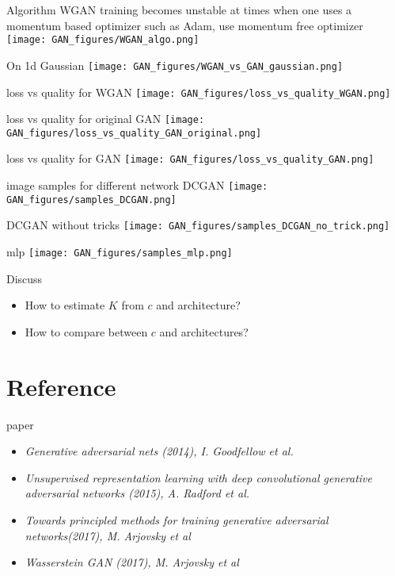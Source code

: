 \documentclass[9pt]{beamer}
\begin{document}
\begin{frame}{Algorithm}
WGAN training becomes unstable at times when one uses a momentum based
optimizer such as Adam, use momentum free optimizer
\texttt{[image: GAN\_figures/WGAN\_algo.png]}
\end{frame}

\begin{frame}{On 1d Gaussian}
  \texttt{[image: GAN\_figures/WGAN\_vs\_GAN\_gaussian.png]}
\end{frame}

\begin{frame}{loss vs quality for WGAN}
  \texttt{[image: GAN\_figures/loss\_vs\_quality\_WGAN.png]}
\end{frame}

\begin{frame}{loss vs quality for original GAN}
  \texttt{[image: GAN\_figures/loss\_vs\_quality\_GAN\_original.png]}
\end{frame}

\begin{frame}{loss vs quality for GAN}
  \texttt{[image: GAN\_figures/loss\_vs\_quality\_GAN.png]}
\end{frame}

\begin{frame}{image samples for different network}
  DCGAN
  \texttt{[image: GAN\_figures/samples\_DCGAN.png]}

  DCGAN without tricks
  \texttt{[image: GAN\_figures/samples\_DCGAN\_no\_trick.png]}

  mlp
  \texttt{[image: GAN\_figures/samples\_mlp.png]}
\end{frame}

\begin{frame}{Discuss}
  \begin{itemize}
  \item How to estimate $K$ from $c$ and architecture?
  \item How to compare between $c$ and architectures?
  \end{itemize}
\end{frame}

\section{Reference}

\begin{frame}{paper}
  \begin{itemize}
  \item \emph{Generative adversarial nets (2014), I. Goodfellow et al.}
  \item \emph{Unsupervised representation learning with deep
    convolutional generative adversarial networks (2015), A. Radford
    et al.}
  \item \emph{Towards principled methods for training generative
    adversarial networks(2017), M. Arjovsky et al}
  \item \emph{Wasserstein GAN (2017), M. Arjovsky et al}
  \end{itemize}
\end{frame}
\end{document}
